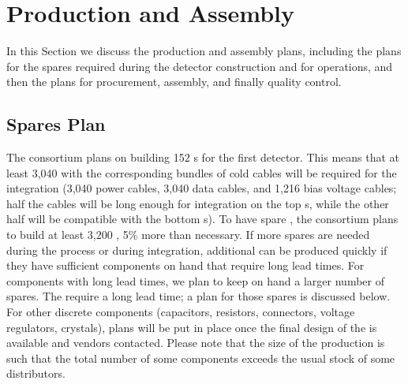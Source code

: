 \section{Production and Assembly}
\label{sec:fdsp-tpcelec-production}

In this Section we discuss the production and assembly plans,
including the plans for the spares required during the detector
construction and for operations, and then the plans for
procurement, assembly, and finally quality control.


\subsection{Spares Plan}
\label{sec:fdsp-tpcelec-production-spares}

The  consortium plans on building 152 s
for the first  detector. This means that at least
3,040  with the corresponding bundles of cold
cables will be required for the integration (3,040 power cables, 3,040 data cables, and 1,216 bias voltage
cables; half the cables will be long enough for 
integration on the top s, while the other half will
be compatible with the bottom s). To have spare , the  consortium plans to
build at least 3,200 , 5\% more than necessary. If more spares are needed during the
 process or during integration, additional 
 can be produced quickly if they have sufficient components on hand that require long lead times.
For components with long lead times, we plan to keep on hand a
larger number of spares. The  require a long lead time; a plan for those spares is
discussed below. For other discrete components
(capacitors, resistors, connectors, voltage regulators, crystals),
plans will be put in place once the final design of the 
is available and vendors contacted. Please note that the
size of the  production is such that the total number
of some components exceeds the usual stock of some distributors.

